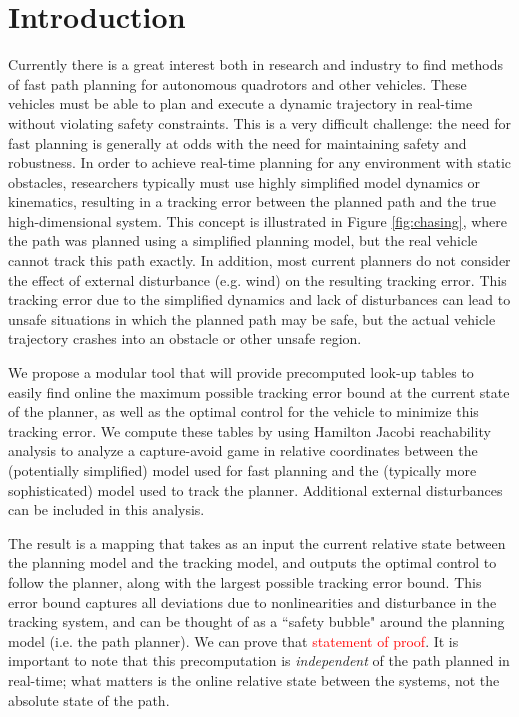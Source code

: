 \section{Introduction}
 Currently there is a great interest both in research and industry to find methods of fast path planning for autonomous quadrotors and other vehicles. These vehicles must be able to plan and execute a dynamic trajectory in real-time without violating safety constraints. This is a very difficult challenge: the need for fast planning is generally at odds with the need for maintaining safety and robustness. In order to achieve real-time planning for any environment with static obstacles, researchers typically must use highly simplified model dynamics or kinematics, resulting in a tracking error between the planned path and the true high-dimensional system. This concept is illustrated in Figure \ref{fig:chasing}, where the path was planned using a simplified planning model, but the real vehicle cannot track this path exactly. In addition, most current planners do not consider the effect of external disturbance (e.g. wind) on the resulting tracking error. This tracking error due to the simplified dynamics and lack of disturbances can lead to unsafe situations in which the planned path may be safe, but the actual vehicle trajectory crashes into an obstacle or other unsafe region.

We propose a modular tool that will provide precomputed look-up tables to easily find online the maximum possible tracking error bound at the current state of the planner, as well as the optimal control for the vehicle to minimize this tracking error. We compute these tables by using Hamilton Jacobi reachability analysis to analyze a capture-avoid game in relative coordinates between the (potentially simplified) model used for fast planning and the (typically more sophisticated) model used to track the planner. Additional external disturbances can be included in this analysis. 

The result is a mapping that takes as an input the current relative state between the planning model and the tracking model, and outputs the optimal control to follow the planner, along with the largest possible tracking error bound. This error bound captures all deviations due to nonlinearities and disturbance in the tracking system, and can be thought of as a ``safety bubble" around the planning model (i.e. the path planner). We can prove that \textcolor{red}{statement of proof}. It is important to note that this precomputation is \textit{independent} of the path planned in real-time; what matters is the online relative state between the systems, not the absolute state of the path. 


